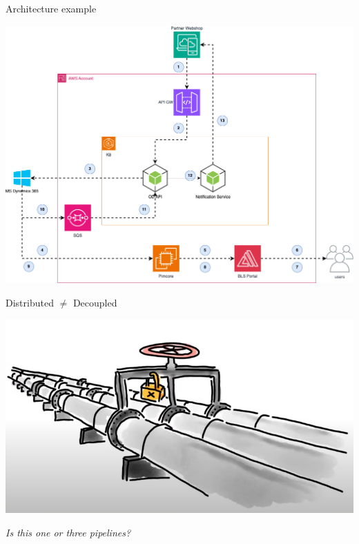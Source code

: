 \begin{frame}{Architecture example}
  \begin{center}
    \includegraphics[scale=.3]{./assets/od.png}
  \end{center}
\end{frame}


\begin{frame}{Distributed $\ne$ Decoupled}
  \begin{center}
    \includegraphics[scale=.43]{./assets/coupling.png}

    \textit{Is this one or three pipelines?}
  \end{center}
\end{frame}

